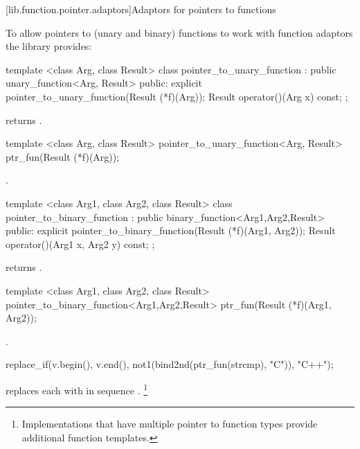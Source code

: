 [lib.function.pointer.adaptors]{Adaptors for pointers to functions}

\pnum
To allow pointers to (unary and binary) functions to work with function adaptors
the library provides:

%
\begin{itemdecl}
  template <class Arg, class Result>
  class pointer_to_unary_function : public unary_function<Arg, Result> {
  public:
    explicit pointer_to_unary_function(Result (*f)(Arg));
    Result operator()(Arg x) const;
  };
\end{itemdecl}

\begin{itemdescr}
\pnum
{} returns .
\end{itemdescr}

%
\begin{itemdecl}
template <class Arg, class Result>
  pointer_to_unary_function<Arg, Result> ptr_fun(Result (*f)(Arg));
\end{itemdecl}

\begin{itemdescr}
\pnum
\returns
{}.
\end{itemdescr}

%
\begin{itemdecl}
    template <class Arg1, class Arg2, class Result>
    class pointer_to_binary_function :
      public binary_function<Arg1,Arg2,Result> {
    public:
      explicit pointer_to_binary_function(Result (*f)(Arg1, Arg2));
      Result operator()(Arg1 x, Arg2 y) const;
    };
\end{itemdecl}

\begin{itemdescr}
\pnum
{} returns .
\end{itemdescr}

%
\begin{itemdecl}
template <class Arg1, class Arg2, class Result>
  pointer_to_binary_function<Arg1,Arg2,Result>
    ptr_fun(Result (*f)(Arg1, Arg2));
\end{itemdecl}

\begin{itemdescr}
\pnum
\returns
{}.

\pnum
\enterexample
\begin{codeblock}
replace_if(v.begin(), v.end(), not1(bind2nd(ptr_fun(strcmp), "C")), "C++");
\end{codeblock}

replaces each  with  in sequence .%
\footnote{Implementations that have multiple pointer to function types
provide additional  function templates.}
\exitexampleb
\end{itemdescr}

